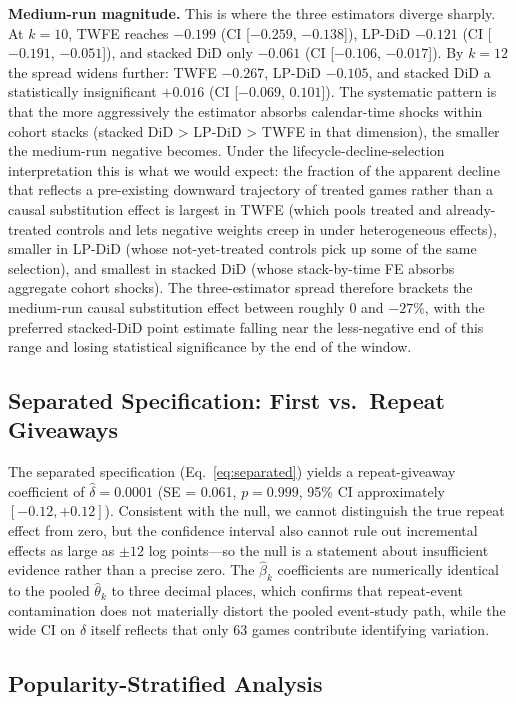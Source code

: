 \documentclass[11pt]{article}
\begin{document}
\textbf{Medium-run magnitude.} This is where the three estimators diverge
sharply. At $k = 10$, TWFE reaches $-0.199$ (CI [$-0.259$, $-0.138$]), LP-DiD
$-0.121$ (CI [$-0.191$, $-0.051$]), and stacked DiD only $-0.061$
(CI [$-0.106$, $-0.017$]). By $k = 12$ the spread widens further: TWFE
$-0.267$, LP-DiD $-0.105$, and stacked DiD a statistically insignificant
$+0.016$ (CI [$-0.069$, $0.101$]). The systematic pattern is that the more
aggressively the estimator absorbs calendar-time shocks within cohort stacks
(stacked DiD > LP-DiD > TWFE in that dimension), the smaller the medium-run
negative becomes. Under the lifecycle-decline-selection interpretation this is
what we would expect: the fraction of the apparent decline that reflects a
pre-existing downward trajectory of treated games rather than a causal
substitution effect is largest in TWFE (which pools treated and already-treated
controls and lets negative weights creep in under heterogeneous effects),
smaller in LP-DiD (whose not-yet-treated controls pick up some of the same
selection), and smallest in stacked DiD (whose stack-by-time FE absorbs
aggregate cohort shocks). The three-estimator spread therefore brackets the
medium-run causal substitution effect between roughly $0$ and $-27\%$, with
the preferred stacked-DiD point estimate falling near the less-negative end
of this range and losing statistical significance by the end of the window.

\subsection{Separated Specification: First vs.\ Repeat Giveaways}

The separated specification (Eq.~\eqref{eq:separated}) yields a repeat-giveaway
coefficient of $\hat{\delta} = 0.0001$ (SE = 0.061, $p = 0.999$, 95\% CI
approximately $[-0.12, +0.12]$). Consistent with the null, we cannot distinguish
the true repeat effect from zero, but the confidence interval also cannot rule out
incremental effects as large as $\pm 12$ log points---so the null is a statement
about insufficient evidence rather than a precise zero. The $\hat{\beta}_k$
coefficients are numerically identical to the pooled $\hat{\theta}_k$ to three
decimal places, which confirms that repeat-event contamination does not materially
distort the pooled event-study path, while the wide CI on $\delta$ itself reflects
that only 63 games contribute identifying variation.

\subsection{Popularity-Stratified Analysis}
\label{ssec:pop}
\end{document}
